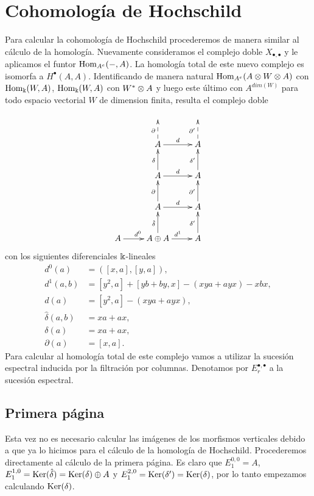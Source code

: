 \documentclass[fleqn,../tesis.tex]{subfiles}
\begin{document}
\section{Cohomología de Hochschild}
Para calcular la cohomología de Hochschild procederemos de manera similar al cálculo de la homología. Nuevamente consideramos
el complejo doble $X_{\bullet, \bullet}$ y le aplicamos el funtor $\operatorname{Hom}_{A^e}(-, A)$. La homología total
de este nuevo complejo es isomorfa a $H^{\bullet}(A, A)$. Identificando de manera natural $\operatorname{Hom}_{A^{e}}(A\otimes W \otimes A)$ con
$\operatorname{Hom}_{\Bbbk}(W, A)$, $\operatorname{Hom}_{\Bbbk}(W, A)$ con $W^{\ast}\otimes A$ y luego este último con $A^{dim(W)}$ para todo
espacio vectorial $W$ de dimension finita, resulta el complejo doble
\begin{align*}
\xymatrix{
	& & \\
	& A \ar@{-->}[u]^{\partial} \ar[r]^{d} & A \ar@{-->}[u]^{\partial'} \\
    & A \ar[u]^{\delta} \ar[r]^{d} & A \ar[u]^{\delta'} \\
    & A \ar[u]^{\partial} \ar[r]^{d} & A \ar[u]^{\partial'} \\
    A \ar[r]^{d^{0}} &A \oplus A \ar[r]^{d^{1}} \ar[u]^{\hat{\delta}} & A \ar[u]^{\delta'}
} 
\end{align*}
con los siguientes diferenciales $\Bbbk$-lineales
\begin{align*}
    d^{0}(a) &= \left([x, a], [y,a]\right),\\
    d^{1}(a, b) &= [y^2, a] + [yb + by, x] - (xya + ayx) - xbx,\\
    d(a) &= [y^2, a] - (xya + ayx),\\
    \hat{\delta}(a, b) &= xa + ax,\\
    \delta(a) &= xa + ax,\\
    \partial(a) &= [x, a].
\end{align*}
Para calcular al homología total de este complejo vamos a utilizar la sucesión espectral inducida por la filtración por columnas.
Denotamos por $E^{\bullet, \bullet}_{r}$ a la sucesión espectral.

\subsection{Primera página}
Esta vez no es necesario calcular las imágenes de los morfismos verticales
debido a que ya lo hicimos para el cálculo de la homología de Hochschild. Procederemos directamente al cálculo de la primera página.
Es claro que $E^{0, 0}_{1} = A$, $E^{1, 0}_{1} = \operatorname{Ker}(\hat{\delta}) = \operatorname{Ker}(\delta)\oplus A$ y $E^{2, 0}_{1} = \operatorname{Ker}(\delta') = \operatorname{Ker}(\delta)$,
por lo tanto empezamos calculando $\operatorname{Ker}(\delta)$.
\end{document}
